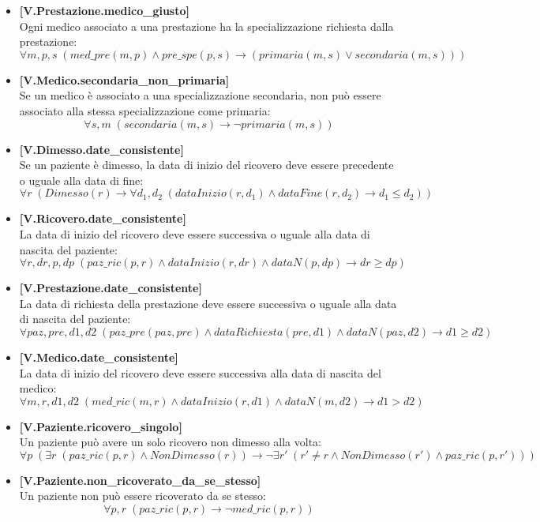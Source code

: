 \documentclass{article}
\begin{document}
\begin{itemize}
    \item \textbf{[V.Prestazione.medico\_giusto]}\\
    Ogni medico associato a una prestazione ha la specializzazione richiesta dalla prestazione:
    \[
    \forall m,p,s \; (med\_pre(m,p) \land pre\_spe(p,s) \rightarrow (primaria(m,s) \lor secondaria(m,s)))
    \]
    
    \item \textbf{[V.Medico.secondaria\_non\_primaria]}\\
    Se un medico è associato a una specializzazione secondaria, non può essere associato alla stessa specializzazione come primaria:
    \[
    \forall s,m \; (secondaria(m,s) \rightarrow \neg primaria(m,s))
    \]
    
    \item \textbf{[V.Dimesso.date\_consistente]}\\
    Se un paziente è dimesso, la data di inizio del ricovero deve essere precedente o uguale alla data di fine:
    \[
    \forall r \; (Dimesso(r) \rightarrow \forall d_1,d_2 \; (dataInizio(r,d_1) \land dataFine(r,d_2) \rightarrow d_1 \leq d_2))
    \]
    
    \item \textbf{[V.Ricovero.date\_consistente]}\\
    La data di inizio del ricovero deve essere successiva o uguale alla data di nascita del paziente:
    \[
    \forall r,dr,p,dp \; (paz\_ric(p,r) \land dataInizio(r,dr) \land dataN(p,dp) \rightarrow dr \geq dp)
    \]
    
    \item \textbf{[V.Prestazione.date\_consistente]}\\
    La data di richiesta della prestazione deve essere successiva o uguale alla data di nascita del paziente:
    \[
    \forall paz,pre,d1,d2 \; (paz\_pre(paz,pre) \land dataRichiesta(pre,d1) \land dataN(paz,d2) \rightarrow d1 \geq d2)
    \]
    
    \item \textbf{[V.Medico.date\_consistente]}\\
    La data di inizio del ricovero deve essere successiva alla data di nascita del medico:
    \[
    \forall m,r,d1,d2 \; (med\_ric(m,r) \land dataInizio(r,d1) \land dataN(m,d2) \rightarrow d1 > d2)
    \]
    
    \item \textbf{[V.Paziente.ricovero\_singolo]}\\
    Un paziente può avere un solo ricovero non dimesso alla volta:
    \[
    \forall p \; (\exists r \; (paz\_ric(p,r) \land NonDimesso(r)) \rightarrow \neg \exists r' \; (r' \neq r \land NonDimesso(r') \land paz\_ric(p,r')))
    \]
    
    \item \textbf{[V.Paziente.non\_ricoverato\_da\_se\_stesso]}\\
    Un paziente non può essere ricoverato da se stesso:
    \[
    \forall p,r \; (paz\_ric(p,r) \rightarrow \neg med\_ric(p,r))
    \]
\end{itemize}
\end{document}
